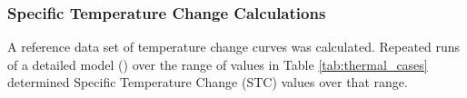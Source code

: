 
\begin{frame}[ctb!]
\frametitle{Specific Temperature Change Calculations}
\footnotesize{A reference data set of temperature change curves was calculated. 
Repeated runs of a detailed model (\cite{hardin_generic_2011, greenberg_investigations_2012, greenberg_application_2012})
over the range of values in Table 
\ref{tab:thermal_cases} determined Specific Temperature Change (STC) values 
over that range.


}
\end{frame}
